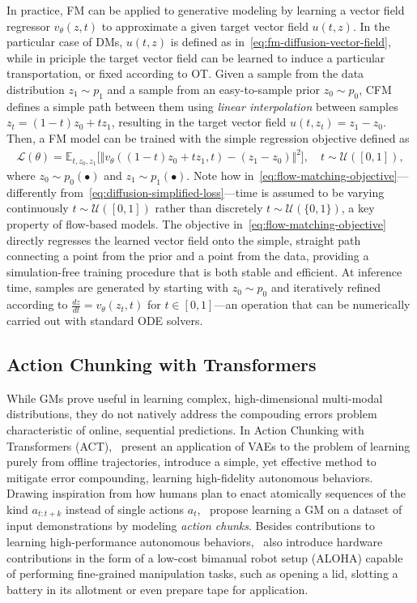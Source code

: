 In practice, FM can be applied to generative modeling by learning a vector field regressor \( v_\theta(z, t) \) to approximate a given target vector field \( u(t, z) \).
In the particular case of DMs, \( u(t, z) \) is defined as in~\ref{eq:fm-diffusion-vector-field}, while in priciple the target vector field can be learned to induce a particular transportation, or fixed according to OT.
Given a sample from the data distribution \( z_1 \sim p_1 \) and a sample from an easy-to-sample prior \( z_0 \sim p_0 \), CFM defines a simple path between them using \emph{linear interpolation} between samples \( z_t = (1-t)z_0 + t z_1 \), resulting in the target vector field \( u(t, z_t) = z_1 - z_0 \).
Then, a FM model can be trained with the simple regression objective defined as
\begin{align}\label{eq:flow-matching-objective}
    \mathcal L(\theta) = \mathbb{E}_{t, z_0, z_1} \big[
        \Vert v_\theta((1-t)z_0 + t z_1, t) - (z_1 - z_0) \Vert^2 \big], \quad t \sim \mathcal{U}([0,1]),
\end{align}
where \( z_0 \sim p_0(\bullet) \) and \( z_1 \sim p_1(\bullet) \). Note how in~\ref{eq:flow-matching-objective}---differently from~\ref{eq:diffusion-simplified-loss}---time is assumed to be varying continuously \( t \sim \mathcal U([0,1]) \) rather than discretely \( t \sim \mathcal U(\{0,1\}) \), a key property of flow-based models.
The objective in~\ref{eq:flow-matching-objective} directly regresses the learned vector field onto the simple, straight path connecting a point from the prior and a point from the data, providing a simulation-free training procedure that is both stable and efficient.
At inference time, samples are generated by starting with \( z_0 \sim p_0 \) and iteratively refined according to \( \frac{dz}{dt} = v_\theta(z_t, t) \) for \(t \in [0,1] \)---an operation that can be numerically carried out with standard ODE solvers.

\subsection{Action Chunking with Transformers}
While GMs prove useful in learning complex, high-dimensional multi-modal distributions, they do not natively address the compouding errors problem characteristic of online, sequential predictions.
In Action Chunking with Transformers (ACT),~\citet{zhaoLearningFineGrainedBimanual2023} present an application of VAEs to the problem of learning purely from offline trajectories, introduce a simple, yet effective method to mitigate error compounding, learning high-fidelity autonomous behaviors.
Drawing inspiration from how humans plan to enact atomically sequences of the kind \( a_{t:t+k} \) instead of single actions \( a_t \),~\citet{zhaoLearningFineGrainedBimanual2023} propose learning a GM on a dataset of input demonstrations by modeling \emph{action chunks}.
Besides contributions to learning high-performance autonomous behaviors,~\citet{zhaoLearningFineGrainedBimanual2023} also introduce hardware contributions in the form of a low-cost bimanual robot setup (ALOHA) capable of performing fine-grained manipulation tasks, such as opening a lid, slotting a battery in its allotment or even prepare tape for application.

